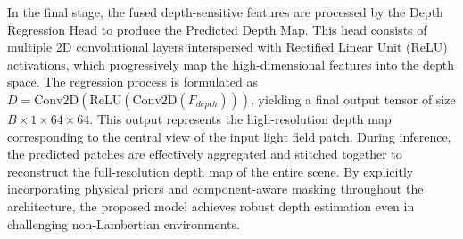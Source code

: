 \documentclass[lettersize,journal]{IEEEtran}
\begin{document}
In the final stage, the fused depth-sensitive features are processed by the Depth Regression Head to produce the Predicted Depth Map. This head consists of multiple 2D convolutional layers interspersed with Rectified Linear Unit (ReLU) activations, which progressively map the high-dimensional features into the depth space. The regression process is formulated as $D = \text{Conv2D}(\text{ReLU}(\text{Conv2D}(F_{depth})))$, yielding a final output tensor of size $B \times 1 \times 64 \times 64$. This output represents the high-resolution depth map corresponding to the central view of the input light field patch. During inference, the predicted patches are effectively aggregated and stitched together to reconstruct the full-resolution depth map of the entire scene. By explicitly incorporating physical priors and component-aware masking throughout the architecture, the proposed model achieves robust depth estimation even in challenging non-Lambertian environments.
\end{document}
